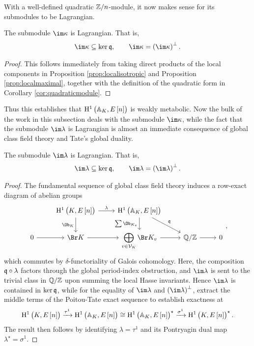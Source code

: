 With a well-defined quadratic $ \mathbb{Z} / n $-module, it now makes sense for its submodules to be Lagrangian.

\begin{corollary}
\label{cor:locallagrangian}
The submodule $ \im \kappa $ is Lagrangian. That is,
$$ \im \kappa \subseteq \ker \qqq, \qquad \im \kappa = \br{\im \kappa}^\perp. $$
\end{corollary}

\begin{proof}
This follows immediately from taking direct products of the local components in Proposition \ref{prop:localisotropic} and Proposition \ref{prop:localmaximal}, together with the definition of the quadratic form in Corollary \ref{cor:quadraticmodule}.
\end{proof}

Thus this establishes that $ \HE[n]{\AA_K} $ is weakly metabolic. Now the bulk of the work in this subsection deals with the submodule $ \im \kappa $, while the fact that the submodule $ \im \lambda $ is Lagrangian is almost an immediate consequence of global class field theory and Tate's global duality.

\begin{proposition}
\label{prop:globallagrangian}
The submodule $ \im \lambda $ is Lagrangian. That is,
$$ \im \lambda \subseteq \ker \qqq, \qquad \im \lambda = \br{\im \lambda}^\perp. $$
\end{proposition}

\begin{proof}
The fundamental sequence of global class field theory induces a row-exact diagram of abelian groups
$$
\begin{tikzcd}
& \HE[n]{K} \arrow{r}{\lambda} \arrow{d}[swap]{\Ob_K} & \HE[n]{\AA_K} \arrow{d}[swap]{\sum \Ob_{K_v}} \arrow{dr}{\qqq} & & \\
0 \arrow{r} & \Br K \arrow{r} & \displaystyle\bigoplus_{v \in \VVV_K} \Br K_v \arrow{r} & \QQ / \ZZ \arrow{r} & 0
\end{tikzcd},
$$
which commutes by $ \delta $-functoriality of Galois cohomology. Here, the composition $ \mathfrak{q} \circ \lambda $ factors through the global period-index obstruction, and $ \im \lambda $ is sent to the trivial class in $ \mathbb{Q} / \mathbb{Z} $ upon summing the local Hasse invariants. Hence $ \im \lambda $ is contained in $ \ker \mathfrak{q} $, while for the equality of $ \im \lambda $ and $ \br{\im \lambda}^\perp $, extract the middle terms of the Poitou-Tate exact sequence to establish exactness at
$$ \HE[n]{K} \xrightarrow{\tau^1} \HE[n]{\AA_K} \cong \HE[n]{\AA_K}^\star \xrightarrow{\sigma^1} \HE[n]{K}^\star. $$
The result then follows by identifying $ \lambda = \tau^1 $ and its Pontryagin dual map $ \lambda^\star = \sigma^1 $.
\end{proof}

